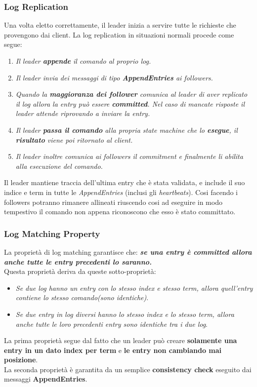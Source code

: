   \subsubsection{Log Replication}
  Una volta eletto correttamente, il leader inizia a servire tutte le richieste che provengono dai client. La log replication in situazioni normali procede come segue:
  \begin{enumerate}
    \item{\emph{Il leader \textbf{appende} il comando al proprio log.}}
    \item{\emph{Il leader invia dei messaggi di tipo \textbf{AppendEntries} ai followers.}}
    \item{\emph{Quando la \textbf{maggioranza dei follower} comunica al leader di aver replicato il log allora la entry può essere \textbf{committed}. Nel caso di mancate risposte il leader attende riprovando a inviare la entry.}}
    \item{\emph{Il leader \textbf{passa il comando} alla propria state machine che lo \textbf{esegue}, il \textbf{risultato} viene poi ritornato al client.}}
    \item{\emph{Il leader inoltre comunica ai followers il commitment e finalmente li abilita alla esecuzione del comando.}}
  \end{enumerate}
  Il leader mantiene traccia dell'ultima entry che è stata validata, e include il suo indice e term in tutte le \textit{AppendEntries} (inclusi gli \textit{heartbeats}). Cosi facendo i followers potranno rimanere allineati riuscendo cosi ad eseguire in modo tempestivo il comando non appena riconoscono che esso è stato committato.

  \subsubsection{Log Matching Property}
  \label{Log Matching}
  La proprietà di log matching garantisce che: \emph{\textbf{se una entry è committed allora anche tutte le entry precedenti lo saranno.}}\\
  Questa proprietà deriva da queste sotto-proprietà:
  \begin{itemize}
    \item{\emph{Se due log hanno un entry con lo stesso index e stesso term, allora quell'entry contiene lo stesso comando(sono identiche)}}.
    \item{\emph{Se due \textit{entry} in log diversi hanno lo stesso index e lo stesso term, allora anche tutte le loro precedenti entry sono identiche tra i due log}}.
  \end{itemize}
  La prima proprietà segue dal fatto che un leader può creare \textbf{solamente una entry in un dato index per term} e \textbf{le entry non cambiando mai posizione}.\\
  La seconda proprietà è garantita da un semplice \textbf{consistency check} eseguito dai messaggi \textbf{AppendEntries}.

